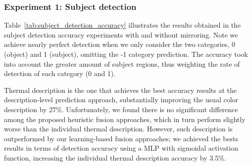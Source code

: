 \documentclass[10pt,twocolumn,letterpaper]{article}
\begin{document}


\subsubsection{Experiment 1: Subject detection}

Table~\ref{tab:subject_detection_accuracy} illustrates the results obtained in the subject detection accuracy experiments with and without mirroring. Note we achieve nearly perfect detection when we only consider the two categories, 0 (object) and 1 (subject), omitting the -1 category prediction. The accuracy took into account the greater amount of subject regions, thus weighting the rate of detection of each category (0 and 1).

Thermal description is the one that achieves the best accuracy results at the description-level prediction approach, substantially improving the usual color description by 27\%. Unfortunately, we found there is no significant difference among the proposed heuristic fusion approaches, which in turn 	perform slightly worse than the individual thermal description. However, such description is outperformed by our learning-based fusion approaches; we achieved the bests results in terms of detection accuracy using a MLP with sigmoidal activation function, increasing the individual thermal description accuracy by 3.5\%.
\end{document}

